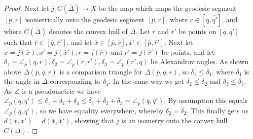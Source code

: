 \documentclass[11pt, a4paper, oneside]{memoir}
\theoremstyle{plain}\newtheorem{theorem}[subsection]{Theorem}
\theoremstyle{definition}
\begin{document}
\begin{proof}
Next let \(j:C(\overline{\Delta})\to X\) be the map which maps the geodesic segment \([\overline{p},\overline{r}]\) isometrically onto the geodesic segment \([p,r]\), where \(\overline{r}\in [\overline{q},\overline{q'}]\), and where \(C(\overline{\Delta})\) denotes the convex hull of \(\overline{\Delta}\).
Let \(\overline{r}\) and \(\overline{r}'\) be points on \([\overline{q},\overline{q}']\) such that \(\overline{r}\in[\overline{q},\overline{r}']\), and let \(\overline{x}\in [\overline{p},\overline{r}],\overline{x}'\in[\overline{p},\overline{r}']\).
Next let \(x=j(\overline{x}),x'=j(\overline{x}'),r=j(\overline{r})\) and \(r'=j(\overline{r}')\) be points, and let \(\delta_1=\angle_p(q,r),\delta_2=\angle_p(r,r'),\delta_3=\angle_p(r',q)\) be Alexandrov angles.
As shown above \(\Delta(\overline{p},\overline{q},\overline{r})\) is a comparison triangle for \(\Delta(p,q,r)\), so \(\delta_1\leq\overline{\delta}_1\), where \(\overline{\delta}_1\) is the angle in \(\overline{\Delta}\) corresponding to \(\delta_1\).
In the same way we get \(\delta_2\leq\overline{\delta}_2\) and \(\delta_3\leq\overline{\delta}_3\).
As \(\angle\) is a pseudometric we have \(\angle_p(q,q')\leq\delta_1+\delta_2+\delta_3\leq\overline{\delta}_1+\overline{\delta}_2+\overline{\delta}_3=\angle_{\overline{p}}(\overline{q},\overline{q}')\). 
By assumption this equals \(\angle_p(q,q')\), so we have equality everywhere, whereby \(\delta_2=\overline{\delta}_2\).
This finally gets us \(d(x,x')=d(\overline{x},\overline{x}')\), showing that \(j\) is an isometry onto the convex hull \(C(\Delta)\).
\end{proof}
\end{document}
